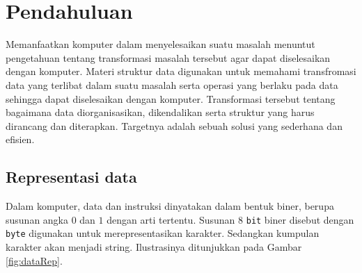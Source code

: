 




\pagestyle{empty} %

\titleGM %
\setcounter{page}{0}
\tableofcontents
\listoffigures
\lstlistoflistings


\chapter{Pendahuluan}
Memanfaatkan komputer dalam menyelesaikan suatu masalah menuntut pengetahuan tentang transformasi masalah tersebut agar dapat diselesaikan dengan komputer. Materi struktur data digunakan untuk memahami transfromasi data yang terlibat dalam suatu masalah serta operasi yang berlaku pada data sehingga dapat diselesaikan dengan komputer. Transformasi tersebut tentang bagaimana data diorganisasikan, dikendalikan serta struktur yang harus dirancang dan diterapkan. Targetnya adalah sebuah solusi yang sederhana dan efisien.

\section{Representasi data}
Dalam komputer, data dan instruksi dinyatakan dalam bentuk biner, berupa susunan angka $0$ dan $1$ dengan arti tertentu. Susunan 8 \texttt{bit} biner disebut dengan \texttt{byte} digunakan untuk merepresentasikan karakter. Sedangkan kumpulan karakter akan menjadi string. Ilustrasinya ditunjukkan pada Gambar \ref{fig:dataRep}.

